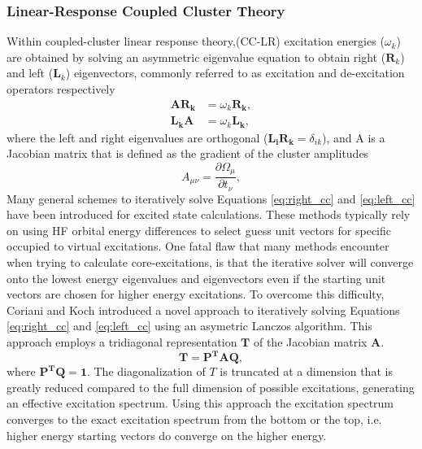 \documentclass{article}
\begin{document}
\subsubsection{Linear-Response Coupled Cluster Theory}
Within coupled-cluster linear response theory,(CC-LR) excitation energies ($\omega_{k}$) are obtained by solving an asymmetric eigenvalue equation to obtain right ($\mathbf{R}_k $) and left ($\mathbf{L}_k$) eigenvectors, commonly referred to as excitation and de-excitation operators respectively
\begin{align}
\label{eq:right_cc}
\mathbf{AR_k} &= \omega_k \mathbf{R_k}, \\
\label{eq:left_cc}
\mathbf{L_kA} &= \omega_k \mathbf{L_k},
\end{align}
where the left and right eigenvalues are orthogonal ($\mathbf{L_iR_k} = \delta_{ik}$), and A is a Jacobian matrix that is defined as the gradient of the cluster amplitudes
\begin{equation}
A_{\mu \nu} = \frac{\partial \Omega_{\mu}}{\partial t_\nu},
\end{equation}
Many general schemes to iteratively solve Equations \ref{eq:right_cc} and \ref{eq:left_cc} have been introduced for excited state calculations. These methods typically rely on using HF orbital energy differences to select guess unit vectors for specific occupied to virtual excitations. One fatal flaw that many methods encounter when trying to calculate core-excitations, is that the iterative solver will converge onto the lowest energy eigenvalues and eigenvectors even if the starting unit vectors are chosen for higher energy excitations. To overcome this difficulty, Coriani and Koch introduced a novel approach to iteratively solving Equations \ref{eq:right_cc} and \ref{eq:left_cc} using an asymetric Lanczos algorithm.\cite{coriani_coupled-cluster_2012,coriani_asymmetric-lanczos-chain-driven_2012} This approach employs a tridiagonal representation $\mathbf{T}$ of the Jacobian matrix $\mathbf{A}$. 
\begin{equation}
\mathbf{T} = \mathbf{P^T A Q},
\end{equation}
where $\mathbf{P^TQ} = \mathbf{1}$. The diagonalization of $T$ is truncated at a dimension that is greatly reduced compared to the full dimension of possible excitations, generating an effective excitation spectrum. Using this approach the excitation spectrum converges to the exact excitation spectrum from the bottom or the top, i.e. higher energy starting vectors do converge on the higher energy. 
\end{document}
